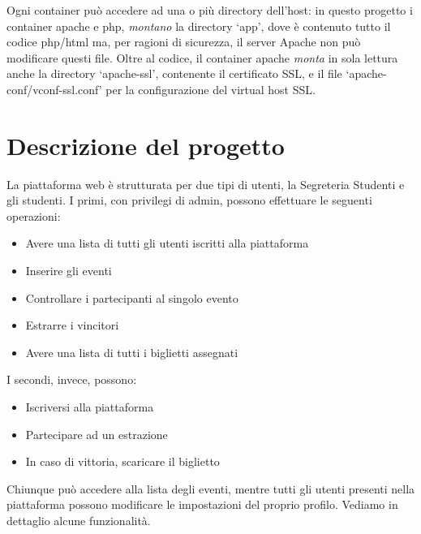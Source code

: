 \documentclass[italian,12pt,a4paper,oneside,final]{report}
\begin{document}
Ogni container può accedere ad una o più directory dell'host: in questo progetto i container apache e php, \textit{montano} la directory `app', dove è contenuto tutto il codice php/html ma, per ragioni di sicurezza, il server Apache non può modificare questi file.
Oltre al codice, il container apache \textit{monta} in sola lettura anche la directory `apache-ssl', contenente il certificato SSL, e il file `apache-conf/vconf-ssl.conf' per la configurazione del virtual host SSL. 

\section{Descrizione del progetto}
La piattaforma web è strutturata per due tipi di utenti, la Segreteria Studenti e gli studenti.
I primi, con privilegi di admin, possono effettuare le seguenti operazioni:

\begin{itemize}
	\item Avere una lista di tutti gli utenti iscritti alla piattaforma
	\item Inserire gli eventi
	\item Controllare i partecipanti al singolo evento
	\item Estrarre i vincitori
	\item Avere una lista di tutti i biglietti assegnati
\end{itemize}
I secondi, invece, possono:
\begin{itemize}
	\item Iscriversi alla piattaforma
	\item Partecipare ad un estrazione
	\item In caso di vittoria, scaricare il biglietto
\end{itemize}
Chiunque può accedere alla lista degli eventi, mentre tutti gli utenti presenti nella piattaforma possono modificare le impostazioni del proprio profilo.
Vediamo in dettaglio alcune funzionalità.
\end{document}
